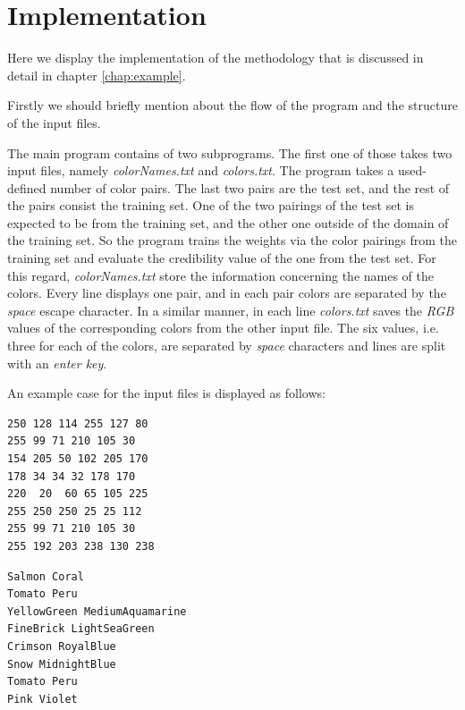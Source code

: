 \documentclass[egilmezThesis.tex]{subfiles}
\begin{document}
\chapter{Implementation}
\label{chap:Implementation}

Here we display the implementation of the methodology that is discussed in detail in chapter \ref{chap:example}.

Firstly we should briefly mention about the flow of the program and the structure of the input files.

The main program contains of two subprograms. The first one of those takes two input files, namely \textit{colorNames.txt} and \textit{colors.txt}.  The program takes a used-defined number of color pairs. The last two pairs are the test set, and the rest of the pairs consist the training set. One of the two pairings of the test set is expected to be from the training set, and the other one outside of the domain of the training set. So the program trains the weights via the color pairings from the training set and evaluate the credibility value of the one from the test set. For this regard, \textit{colorNames.txt} store the information concerning the names of the colors. Every line displays one pair, and in each pair colors are separated by the \textit{space} escape character. In a similar manner, in each line \textit{colors.txt} saves the \textit{RGB} values of the corresponding colors from the other input file. The six values, i.e. three for each of the colors, are separated by \textit{space} characters and lines are split with an \textit{enter key}.

An example case for the input files is displayed as follows:
\newline
\newline
\lstset{language=C++,basicstyle=\footnotesize}
\begin{lstlisting}[caption=colors.txt, breaklines=true]
250 128 114 255 127 80
255 99 71 210 105 30
154 205 50 102 205 170
178 34 34 32 178 170
220  20  60 65 105 225
255 250 250 25 25 112
255 99 71 210 105 30
255 192 203 238 130 238
\end{lstlisting}

\lstset{language=C++,basicstyle=\footnotesize}
\begin{lstlisting}[caption=colorNames.txt, breaklines=true]
Salmon Coral
Tomato Peru
YellowGreen MediumAquamarine	
FineBrick LightSeaGreen
Crimson RoyalBlue
Snow MidnightBlue
Tomato Peru
Pink Violet
\end{lstlisting}
\end{document}
